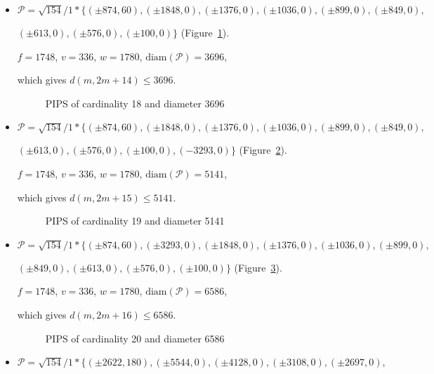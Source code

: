 \documentclass[12pt]{article}
\theoremstyle{theorem}
\theoremstyle{dfn}
\theoremstyle{remark}
\begin{document}
\begin{itemize}
\item
$\mathcal{P}=\sqrt{154}/{1} * \{ (\pm 874, 60),
(\pm 1848 , 0),
(\pm 1376 , 0),
(\pm 1036 , 0),
(\pm 899 , 0),
(\pm 849 , 0),
$

$
(\pm 613 , 0),
(\pm 576 , 0),
(\pm 100 , 0)\}
$
(Figure~\ref{picture_14.png}).

$f = 1748$, $v = 336$, $w = 1780$, $\operatorname{diam(\mathcal{P})} = 3696$,

which gives $d(m, 2m + 14) \leq 3696$.


\begin{figure}[h!]
\parbox{0.85\linewidth}{\caption{PIPS of cardinality 18 and diameter 3696}
\label{picture_14.png}}
\end{figure}


\item
$\mathcal{P}=\sqrt{154}/{1} * \{ (\pm 874, 60),
(\pm 1848 , 0),
(\pm 1376 , 0),
(\pm 1036 , 0),
(\pm 899 , 0),
(\pm 849 , 0),
$

$
(\pm 613 , 0),
(\pm 576 , 0),
(\pm 100 , 0),
(-3293 , 0)\}
$
(Figure~\ref{picture_15.png}).

$f = 1748$, $v = 336$, $w = 1780$, $\operatorname{diam(\mathcal{P})} = 5141$,

which gives $d(m, 2m + 15) \leq 5141$.


\begin{figure}[h!]
\parbox{1\linewidth}{\caption{PIPS of cardinality 19 and diameter 5141}
\label{picture_15.png}}
\end{figure}


\item
$\mathcal{P}=\sqrt{154}/{1} * \{ (\pm 874, 60),
(\pm 3293 , 0),
(\pm 1848 , 0),
(\pm 1376 , 0),
(\pm 1036 , 0),
(\pm 899 , 0),
$

$
(\pm 849 , 0),
(\pm 613 , 0),
(\pm 576 , 0),
(\pm 100 , 0)\}
$
(Figure~\ref{picture_16.png}).

$f = 1748$, $v = 336$, $w = 1780$, $\operatorname{diam(\mathcal{P})} = 6586$,

which gives $d(m, 2m + 16) \leq 6586$.


\begin{figure}[h!]
\parbox{1\linewidth}{\caption{PIPS of cardinality 20 and diameter 6586}
\label{picture_16.png}}
\end{figure}


\item
$\mathcal{P}=\sqrt{154}/{1} * \{ (\pm 2622, 180),
(\pm 5544 , 0),
(\pm 4128 , 0),
(\pm 3108 , 0),
(\pm 2697 , 0),
$


\end{itemize}
\end{document}
